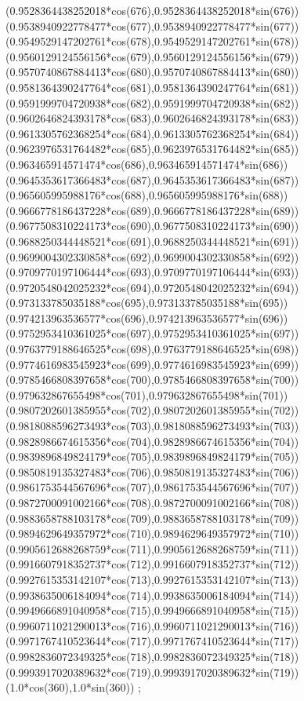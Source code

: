 {({0.9528364438252018*cos(676)},{0.9528364438252018*sin(676)})
({0.9538940922778477*cos(677)},{0.9538940922778477*sin(677)})
({0.9549529147202761*cos(678)},{0.9549529147202761*sin(678)})
({0.9560129124556156*cos(679)},{0.9560129124556156*sin(679)})
({0.9570740867884413*cos(680)},{0.9570740867884413*sin(680)})
({0.9581364390247764*cos(681)},{0.9581364390247764*sin(681)})
({0.9591999704720938*cos(682)},{0.9591999704720938*sin(682)})
({0.9602646824393178*cos(683)},{0.9602646824393178*sin(683)})
({0.9613305762368254*cos(684)},{0.9613305762368254*sin(684)})
({0.9623976531764482*cos(685)},{0.9623976531764482*sin(685)})
({0.963465914571474*cos(686)},{0.963465914571474*sin(686)})
({0.9645353617366483*cos(687)},{0.9645353617366483*sin(687)})
({0.965605995988176*cos(688)},{0.965605995988176*sin(688)})
({0.9666778186437228*cos(689)},{0.9666778186437228*sin(689)})
({0.9677508310224173*cos(690)},{0.9677508310224173*sin(690)})
({0.9688250344448521*cos(691)},{0.9688250344448521*sin(691)})
({0.9699004302330858*cos(692)},{0.9699004302330858*sin(692)})
({0.9709770197106444*cos(693)},{0.9709770197106444*sin(693)})
({0.9720548042025232*cos(694)},{0.9720548042025232*sin(694)})
({0.973133785035188*cos(695)},{0.973133785035188*sin(695)})
({0.974213963536577*cos(696)},{0.974213963536577*sin(696)})
({0.9752953410361025*cos(697)},{0.9752953410361025*sin(697)})
({0.9763779188646525*cos(698)},{0.9763779188646525*sin(698)})
({0.9774616983545923*cos(699)},{0.9774616983545923*sin(699)})
({0.9785466808397658*cos(700)},{0.9785466808397658*sin(700)})
({0.979632867655498*cos(701)},{0.979632867655498*sin(701)})
({0.9807202601385955*cos(702)},{0.9807202601385955*sin(702)})
({0.9818088596273493*cos(703)},{0.9818088596273493*sin(703)})
({0.9828986674615356*cos(704)},{0.9828986674615356*sin(704)})
({0.9839896849824179*cos(705)},{0.9839896849824179*sin(705)})
({0.9850819135327483*cos(706)},{0.9850819135327483*sin(706)})
({0.9861753544567696*cos(707)},{0.9861753544567696*sin(707)})
({0.9872700091002166*cos(708)},{0.9872700091002166*sin(708)})
({0.9883658788103178*cos(709)},{0.9883658788103178*sin(709)})
({0.9894629649357972*cos(710)},{0.9894629649357972*sin(710)})
({0.9905612688268759*cos(711)},{0.9905612688268759*sin(711)})
({0.9916607918352737*cos(712)},{0.9916607918352737*sin(712)})
({0.9927615353142107*cos(713)},{0.9927615353142107*sin(713)})
({0.9938635006184094*cos(714)},{0.9938635006184094*sin(714)})
({0.9949666891040958*cos(715)},{0.9949666891040958*sin(715)})
({0.9960711021290013*cos(716)},{0.9960711021290013*sin(716)})
({0.9971767410523644*cos(717)},{0.9971767410523644*sin(717)})
({0.9982836072349325*cos(718)},{0.9982836072349325*sin(718)})
({0.9993917020389632*cos(719)},{0.9993917020389632*sin(719)})
({1.0*cos(360)},{1.0*sin(360)})
};

